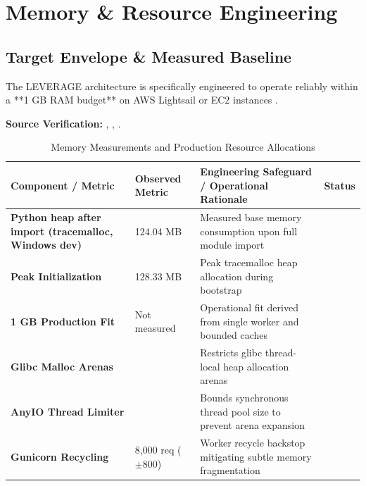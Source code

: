 \chapter{Memory \& Resource Engineering}
\label{ch:memory_engineering}

\section{Target Envelope \& Measured Baseline}
The LEVERAGE architecture is specifically engineered to operate reliably within a **1 GB RAM budget** on AWS Lightsail or EC2 instances \cite{ref:deploy_guide}.

\begin{citationbox}
\textbf{Source Verification:} , , .
\end{citationbox}

\begin{table}[htbp]
\centering
\small
\sffamily
\caption{Memory Measurements and Production Resource Allocations}
\label{tab:memory_measurements}
\begin{tabularx}{\linewidth}{p{38mm} p{26mm} Y p{22mm}}
\toprule
\textbf{Component / Metric} & \textbf{Observed Metric} & \textbf{Engineering Safeguard / Operational Rationale} & \textbf{Status} \\
\midrule
\textbf{Python heap after import (tracemalloc, Windows dev)} & 124.04 MB & Measured base memory consumption upon full module import &  \\
\textbf{Peak Initialization} & 128.33 MB & Peak tracemalloc heap allocation during bootstrap &  \\
\textbf{1 GB Production Fit} & Not measured & Operational fit derived from single worker and bounded caches &  \\
\textbf{Glibc Malloc Arenas} &  & Restricts glibc thread-local heap allocation arenas &  \\
\textbf{AnyIO Thread Limiter} &  & Bounds synchronous thread pool size to prevent arena expansion &  \\
\textbf{Gunicorn Recycling} & 8,000 req ($\pm 800$) & Worker recycle backstop mitigating subtle memory fragmentation &  \\
\bottomrule
\end{tabularx}
\end{table}

